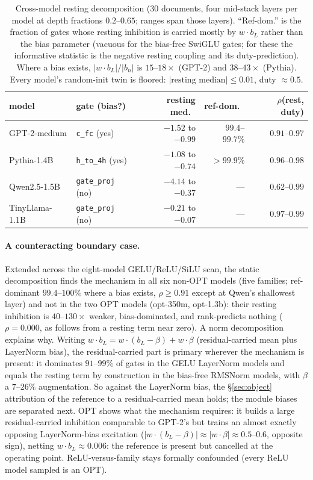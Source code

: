 \documentclass[11pt]{article}
\newcommand{\bl}{b_L}
\begin{document}
\begin{table}[t]
\centering
\small
\begin{tabular}{llrrr}
\toprule
model & gate (bias?) & resting med.\ & ref-dom.\ & $\rho$(rest, duty) \\
\midrule
GPT-2-medium   & \texttt{c\_fc} (yes)         & $-1.52$ to $-0.99$ & $99.4$--$99.7\%$ & $0.91$--$0.97$ \\
Pythia-1.4B    & \texttt{h\_to\_4h} (yes)     & $-1.08$ to $-0.74$ & $>99.9\%$        & $0.96$--$0.98$ \\
Qwen2.5-1.5B   & \texttt{gate\_proj} (no)     & $-4.14$ to $-0.37$ & ---              & $0.62$--$0.99$ \\
TinyLlama-1.1B & \texttt{gate\_proj} (no)     & $-0.21$ to $-0.07$ & ---              & $0.97$--$0.99$ \\
\bottomrule
\end{tabular}
\caption{Cross-model resting decomposition (30 documents, four
mid-stack layers per model at depth fractions $0.2$--$0.65$; ranges
span those layers). ``Ref-dom.'' is the fraction of gates whose
resting inhibition is carried mostly by $w\cdot\bl$ rather than the
bias parameter (vacuous for the bias-free SwiGLU gates; for these the
informative statistic is the negative resting coupling and its
duty-prediction). Where a bias exists, $|w\cdot\bl|/|b_n|$ is
$15$--$18\times$ (GPT-2) and $38$--$43\times$ (Pythia). Every model's
random-init twin is floored: $|\text{resting median}| \leq 0.01$, duty
$\approx 0.5$.}
\label{tab:bias_xmodel}
\end{table}

\paragraph{A counteracting boundary case.} Extended across the
eight-model GELU/ReLU/SiLU scan, the static decomposition finds the
mechanism in all six non-OPT models (five families; ref-dominant $99.4$--$100\%$ where a bias exists,
$\rho \geq 0.91$ except at Qwen's shallowest layer) and not in the two OPT models (opt-350m,
opt-1.3b): their resting inhibition is $40$--$130\times$ weaker,
bias-dominated, and rank-predicts nothing ($\rho = 0.000$, as follows
from a resting term near zero). A norm
decomposition explains why. Writing $w\cdot\bl = w\cdot(\bl - \beta) +
w\cdot\beta$ (residual-carried mean plus LayerNorm bias), the
residual-carried part is primary wherever the mechanism is present:
it dominates $91$--$99\%$ of gates in the GELU LayerNorm models and
equals the resting term by construction in the bias-free RMSNorm
models, with $\beta$ a $7$--$26\%$ augmentation. So against the LayerNorm
bias, the \S\ref{sec:object} attribution of the reference to a
residual-carried mean holds; the module biases are separated next. OPT shows what
the mechanism requires: it builds a large
residual-carried inhibition comparable to GPT-2's but trains an almost
exactly opposing LayerNorm-bias excitation ($|w\cdot(\bl-\beta)| \approx
|w\cdot\beta| \approx 0.5$--$0.6$, opposite sign), netting
$w\cdot\bl \approx 0.006$: the reference is present but cancelled at
the operating point. ReLU-versus-family stays formally confounded (every
ReLU model sampled is an OPT).
\end{document}
